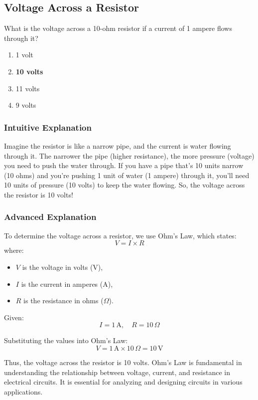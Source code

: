 \subsection{Voltage Across a Resistor}
\label{T5D11}

\begin{tcolorbox}[colback=gray!10!white,colframe=black!75!black,title=T5D11]
What is the voltage across a 10-ohm resistor if a current of 1 ampere flows through it?
\begin{enumerate}[label=\Alph*)]
    \item 1 volt
    \item \textbf{10 volts}
    \item 11 volts
    \item 9 volts
\end{enumerate}
\end{tcolorbox}

\subsubsection{Intuitive Explanation}
Imagine the resistor is like a narrow pipe, and the current is water flowing through it. The narrower the pipe (higher resistance), the more pressure (voltage) you need to push the water through. If you have a pipe that’s 10 units narrow (10 ohms) and you’re pushing 1 unit of water (1 ampere) through it, you’ll need 10 units of pressure (10 volts) to keep the water flowing. So, the voltage across the resistor is 10 volts!

\subsubsection{Advanced Explanation}
To determine the voltage across a resistor, we use Ohm's Law, which states:
\[
V = I \times R
\]
where:
\begin{itemize}
    \item \( V \) is the voltage in volts (V),
    \item \( I \) is the current in amperes (A),
    \item \( R \) is the resistance in ohms (\(\Omega\)).
\end{itemize}

Given:
\[
I = 1 \, \text{A}, \quad R = 10 \, \Omega
\]

Substituting the values into Ohm's Law:
\[
V = 1 \, \text{A} \times 10 \, \Omega = 10 \, \text{V}
\]

Thus, the voltage across the resistor is 10 volts. Ohm's Law is fundamental in understanding the relationship between voltage, current, and resistance in electrical circuits. It is essential for analyzing and designing circuits in various applications.

